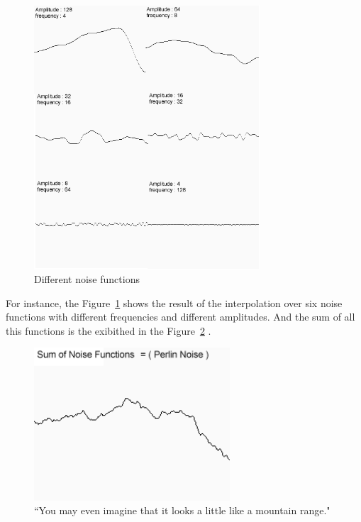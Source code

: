 \begin{figure}[H]
	\centering
	\includegraphics[width=0.75\textwidth]{img/Theory/Perlin_Noise/Merge.png}
	\caption{Different noise functions}
	\label{fig:merge}
\end{figure}



For instance, the Figure~\ref{fig:merge} shows the result of the interpolation over six noise functions with different frequencies and different amplitudes. And the sum of all this functions is the exibithed in the Figure~\ref{fig:noise} \cite{NoisesELIAS}.

\begin{figure}[htbp]
	\centering
	\includegraphics[width=0.65\textwidth]{img/Theory/Perlin_Noise/perlin1.png}
	\caption{``You may even imagine that it looks a little like a mountain range."}
	\label{fig:noise}
\end{figure}


